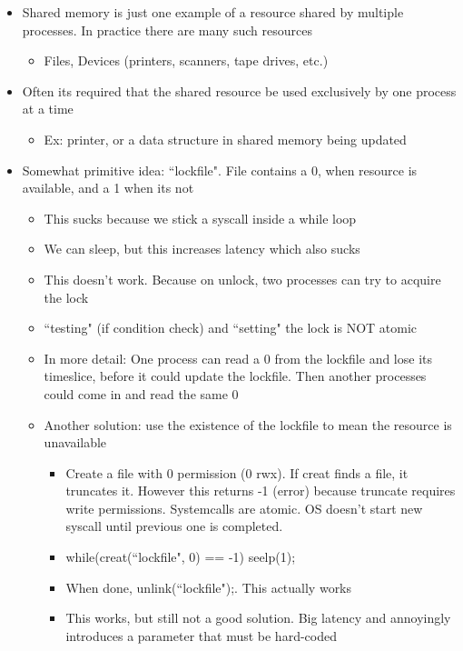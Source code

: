 \begin{itemize}
    \item Shared memory is just one example of a resource shared by multiple processes. In practice there are many such resources
    \begin{itemize}
        \item Files, Devices (printers, scanners, tape drives, etc.)
    \end{itemize}
    \item Often its required that the shared resource be used exclusively by one process at a time
    \begin{itemize}
        \item Ex: printer, or a data structure in shared memory being updated
    \end{itemize}
    \item Somewhat primitive idea: ``lockfile". File contains a 0, when resource is available, and a 1 when its not
    \begin{itemize}
        \item This sucks because we stick a syscall inside a while loop
        \item We can sleep, but this increases latency which also sucks
        \item This doesn't work. Because on unlock, two processes can try to acquire the lock
        \item ``testing" (if condition check) and ``setting" the lock is NOT atomic
        \item In more detail: One process can read a 0 from the lockfile and lose its timeslice, before it could update the lockfile. Then another processes could come in and read the same 0
        \item Another solution: use the existence of the lockfile to mean the resource is unavailable
        \begin{itemize}
            \item Create a file with 0 permission (0 rwx). If creat finds a file, it truncates it. However this returns -1 (error) because truncate requires write permissions. Systemcalls are atomic. OS doesn't start new syscall until previous one is completed.
            \item while(creat(``lockfile", 0) == -1) seelp(1);
            \item When done, unlink(``lockfile");. This actually works
            \item This works, but still not a good solution. Big latency and annoyingly introduces a parameter that must be hard-coded
        \end{itemize}
    \end{itemize}
\end{itemize}